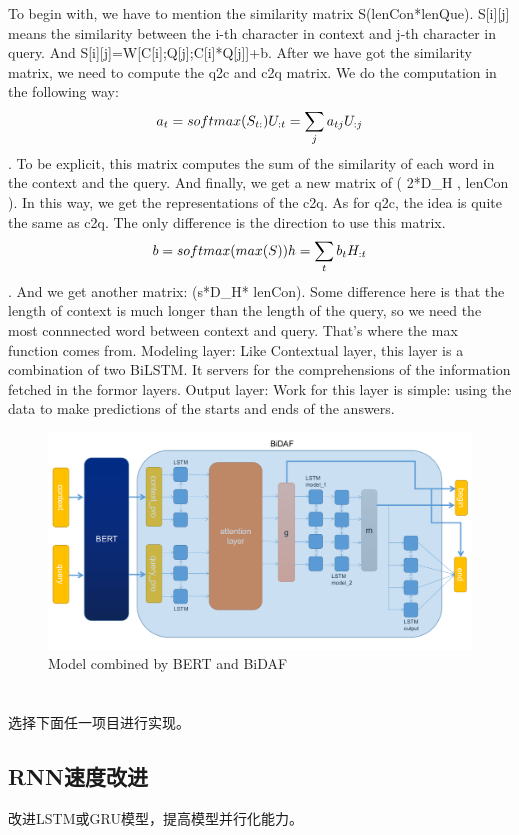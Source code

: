 \documentclass{article}
\begin{document}
To begin with, we have to mention the similarity matrix S(lenCon*lenQue). S[i][j] means the similarity between the i-th character in context and j-th character in query. And S[i][j]=W[C[i];Q[j];C[i]*Q[j]]+b.
After we have got the similarity matrix, we need to compute the q2c and c2q matrix. We do the computation in the following way: $$a_t=softmax(S_{t:})\\U_{:t}=\sum_{j}a_{tj}U_{:j}$$. To be explicit, this matrix computes the sum of the similarity of each word in the context and the query. And finally, we get a new matrix of ( 2*D_H , lenCon ). In this way, we get the representations of the c2q.
As for q2c, the idea is quite the same as c2q. The only difference is the direction to use this matrix. $$b=softmax(max(S))\\h=\sum_tb_tH_{:t}$$. And we get another matrix: (s*D_H* lenCon). Some difference here is that the length of context is much longer than the length of the query, so we need the most connnected word between context and query. That's where the max function comes from.
Modeling layer: Like Contextual layer, this layer is a combination of two BiLSTM. It servers for the comprehensions of the information fetched in the formor layers. 
Output layer: Work for this layer is simple: using the data to make predictions of the starts and ends of the answers.
\begin{figure}[h]
	\centering
	\includegraphics[scale=0.3 ]{Model.png}
	\caption{Model combined by BERT and BiDAF}
\end{figure}
\section{}

选择下面任一项目进行实现。

\subsection{RNN速度改进}
改进LSTM或GRU模型，提高模型并行化能力。
\end{document}
